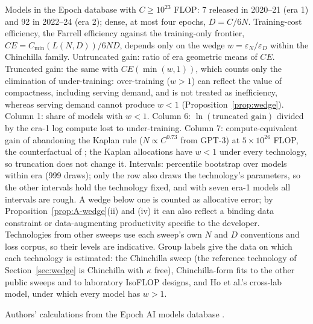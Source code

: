 \begin{table}[tp]
\begin{tablenotes}
Models in the Epoch database with $C\geq10^{23}$ FLOP: 7 released in 2020--21 (era 1) and 92 in 2022--24 (era 2); dense, at most four epochs, $D=C/6N$. Training-cost efficiency, the Farrell efficiency against the training-only frontier, $CE=C_{\min}(L(N,D))/6ND$, depends only on the wedge $w=\varepsilon_N/\varepsilon_D$ within the Chinchilla family. Untruncated gain: ratio of era geometric means of $CE$. Truncated gain: the same with $CE(\min(w,1))$, which counts only the elimination of under-training: over-training ($w>1$) can reflect the value of compactness, including serving demand, and is not treated as inefficiency, whereas serving demand cannot produce $w<1$ (Proposition~\ref{prop:wedge}). Column 1: share of models with $w<1$. Column 6: $\ln(\text{truncated gain})$ divided by the era-1 log compute lost to under-training. Column 7: compute-equivalent gain of abandoning the Kaplan rule ($N\propto C^{0.73}$ from GPT-3) at $5\times10^{26}$ FLOP, the counterfactual of \citet{gundlach2025origin}; the Kaplan allocations have $w<1$ under every technology, so truncation does not change it. Intervals: percentile bootstrap over models within era (999 draws); only the \citet{besiroglu2024chinchilla} row also draws the technology's parameters, so the other intervals hold the technology fixed, and with seven era-1 models all intervals are rough. A wedge below one is counted as allocative error; by Proposition~\ref{prop:A-wedge}(ii) and (iv) it can also reflect a binding data constraint or data-augmenting productivity specific to the developer. Technologies from other sweeps use each sweep's own $N$ and $D$ conventions and loss corpus, so their levels are indicative. Group labels give the data on which each technology is estimated: the Chinchilla sweep (the reference technology of Section~\ref{sec:wedge} is Chinchilla with $\kappa$ free), Chinchilla-form fits to the other public sweeps and to laboratory IsoFLOP designs, and Ho et al.'s cross-lab model, under which every model has $w>1$.
\end{tablenotes}
\begin{tablenotes}[Source]
Authors' calculations from the Epoch AI models database \citep{epochai2026data}.
\end{tablenotes}
\end{table}
